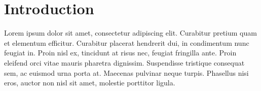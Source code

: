 \section{Introduction}

Lorem ipsum dolor sit amet, consectetur adipiscing elit. Curabitur pretium quam et elementum efficitur. Curabitur placerat hendrerit dui, in condimentum nunc feugiat in. 
Proin nisl ex, tincidunt at risus nec, feugiat fringilla ante. Proin eleifend orci vitae mauris pharetra dignissim. Suspendisse tristique consequat sem, ac euismod urna porta at. 
Maecenas pulvinar neque turpis. Phasellus nisi eros, auctor non nisl sit amet, molestie porttitor ligula.